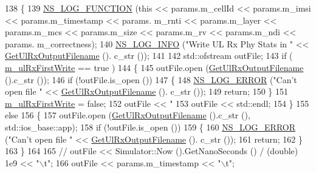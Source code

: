 \begin{DoxyCode}
138 \{
139   \hyperlink{log-macros-disabled_8h_a90b90d5bad1f39cb1b64923ea94c0761}{NS\_LOG\_FUNCTION} (\textcolor{keyword}{this} << params.m\_cellId << params.m\_imsi << params.m\_timestamp << params.
      m\_rnti << params.m\_layer << params.m\_mcs << params.m\_size << params.m\_rv << params.m\_ndi << params.
      m\_correctness);
140   \hyperlink{group__logging_gafbd73ee2cf9f26b319f49086d8e860fb}{NS\_LOG\_INFO} (\textcolor{stringliteral}{"Write UL Rx Phy Stats in "} << \hyperlink{classns3_1_1PhyRxStatsCalculator_a1055ec6b6ec788fad2a17d8ed835f37b}{GetUlRxOutputFilename} ().
      c\_str ());
141 
142   std::ofstream outFile;
143   \textcolor{keywordflow}{if} ( \hyperlink{classns3_1_1PhyRxStatsCalculator_a55444d2052b042d6541f412b6a0340f3}{m\_ulRxFirstWrite} == \textcolor{keyword}{true} )
144     \{
145       outFile.open (\hyperlink{classns3_1_1PhyRxStatsCalculator_a1055ec6b6ec788fad2a17d8ed835f37b}{GetUlRxOutputFilename} ().c\_str ());
146       \textcolor{keywordflow}{if} (!outFile.is\_open ())
147         \{
148           \hyperlink{group__logging_ga0261a8db1d4ac5f79417d117634fd455}{NS\_LOG\_ERROR} (\textcolor{stringliteral}{"Can't open file "} << \hyperlink{classns3_1_1PhyRxStatsCalculator_a1055ec6b6ec788fad2a17d8ed835f37b}{GetUlRxOutputFilename} ().
      c\_str ());
149           \textcolor{keywordflow}{return};
150         \}
151       \hyperlink{classns3_1_1PhyRxStatsCalculator_a55444d2052b042d6541f412b6a0340f3}{m\_ulRxFirstWrite} = \textcolor{keyword}{false};
152       outFile << \textcolor{stringliteral}{"%
153       outFile << std::endl;
154     \}
155   \textcolor{keywordflow}{else}
156     \{
157       outFile.open (\hyperlink{classns3_1_1PhyRxStatsCalculator_a1055ec6b6ec788fad2a17d8ed835f37b}{GetUlRxOutputFilename} ().c\_str (),  std::ios\_base::app);
158       \textcolor{keywordflow}{if} (!outFile.is\_open ())
159         \{
160           \hyperlink{group__logging_ga0261a8db1d4ac5f79417d117634fd455}{NS\_LOG\_ERROR} (\textcolor{stringliteral}{"Can't open file "} << \hyperlink{classns3_1_1PhyRxStatsCalculator_a1055ec6b6ec788fad2a17d8ed835f37b}{GetUlRxOutputFilename} ().
      c\_str ());
161           \textcolor{keywordflow}{return};
162         \}
163     \}
164 
165 \textcolor{comment}{//   outFile << Simulator::Now ().GetNanoSeconds () / (double) 1e9 << "\(\backslash\)t";}
166   outFile << params.m\_timestamp << \textcolor{stringliteral}{"\(\backslash\)t"};
}
\end{DoxyCode}
